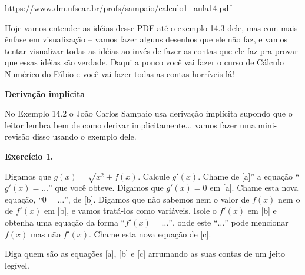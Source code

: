 \documentclass[oneside,12pt]{article}
\begin{document}
\ssk

\url{https://www.dm.ufscar.br/profs/sampaio/calculo1\_aula14.pdf}

\ssk

Hoje vamos entender as idéias desse PDF até o exemplo 14.3 dele, mas
com mais ênfase em visualização -- vamos fazer alguns desenhos que ele
não faz, e vamos tentar visualizar todas as idéias ao invés de fazer
as contas que ele faz pra provar que essas idéias são verdade. Daqui a
pouco você vai fazer o curso de Cálculo Numérico do Fábio e você vai
fazer todas as contas horríveis lá!

\msk




\newpage



{\bf Derivação implícita}

\ssk

No Exemplo 14.2 o João Carlos Sampaio usa derivação implícita supondo
que o leitor lembra bem de como derivar implicitamente... vamos fazer
uma mini-revisão disso usando o exemplo dele.

\msk


{\bf Exercício 1.}

Digamos que $g(x) = \sqrt{x^2 + f(x)}$. Calcule $g'(x)$. Chame de
[a]'' a equação ``$g'(x) = \ldots$'' que você obteve. Digamos que
$g'(x)=0$ em [a]. Chame esta nova equação, ``$0 = \ldots$'', de [b].
Digamos que não sabemos nem o valor de $f(x)$ nem o de $f'(x)$ em [b],
e vamos tratá-los como variáveis. Isole o $f'(x)$ em [b] e obtenha uma
equação da forma ``$f'(x) = \ldots$'', onde este ``$\ldots$'' pode
mencionar $f(x)$ mas não $f'(x)$. Chame esta nova equação de [c].

Diga quem são as equações [a], [b] e [c] arrumando as suas contas de
um jeito legível.


\newpage
\end{document}
